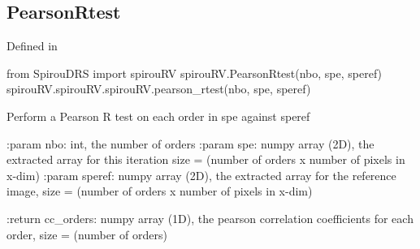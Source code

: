 \noindent\begin{minipage}{\textwidth}
\subsection{PearsonRtest}

Defined in \spirouRV{}

\begin{pythonbox}
from SpirouDRS import spirouRV
spirouRV.PearsonRtest(nbo, spe, speref)
spirouRV.spirouRV.spirouRV.pearson_rtest(nbo, spe, speref)
\end{pythonbox}

\begin{pythondocstring}
Perform a Pearson R test on each order in spe against speref

:param nbo: int, the number of orders
:param spe: numpy array (2D), the extracted array for this iteration
            size = (number of orders x number of pixels in x-dim)
:param speref: numpy array (2D), the extracted array for the reference
               image, size = (number of orders x number of pixels in x-dim)

:return cc_orders: numpy array (1D), the pearson correlation coefficients
                   for each order, size = (number of orders)
\end{pythondocstring}
\end{minipage}

